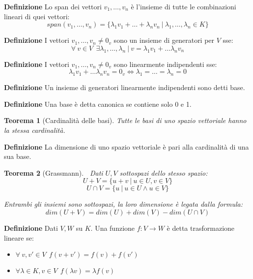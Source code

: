 \documentclass{article}
\newtheorem{theorem}{Teorema}
\begin{document}
\noindent\textbf{Definizione} Lo span dei vettori $v_1,\ldots,v_n$ è l'insieme di tutte le combinazioni lineari di quei vettori:
$$span(v_1,\ldots,v_n)=\{\lambda_1 v_1+\ldots+\lambda_n v_n\ |\ \lambda_1,\ldots,\lambda_n\in K\}$$\newline

\noindent\textbf{Definizione} I vettori $v_1,\ldots,v_n\neq 0_v$ sono un insieme di generatori per $V$ sse:
$$\forall\ v\in V\ \ \exists\lambda_1,\ldots,\lambda_n\ |\ v=\lambda_1v_1+\ldots
\lambda_nv_n$$\newline

\noindent\textbf{Definizione} I vettori $v_1,\ldots,v_n\neq 0_v$ sono linearmente indipendenti sse:
$$\lambda_1v_1+\ldots
\lambda_nv_n=0_v\iff \lambda_1=\ldots=\lambda_n=0$$\newline

\noindent\textbf{Definizione} Un insieme di generatori linearmente indipendenti sono detti base.\newline

\noindent\textbf{Definizione} Una base è detta canonica se contiene solo 0 e 1.\newline

\begin{theorem}[Cardinalità delle basi]
    Tutte le basi di uno spazio vettoriale hanno la stessa cardinalità.\newline
\end{theorem}

\noindent\textbf{Definizione} La dimensione di uno spazio vettoriale è pari alla cardinalità di una sua base.\newline

\begin{theorem}[Grassmann]$\ $\newline
    Dati $U,V$ sottospazi dello stesso spazio:
    $$U+V=\{u+v\ |\ u\in U,v\in V\}$$
    $$U\cap V=\{u\ |\ u\in U\wedge u\in V\}$$

    \noindent Entrambi gli insiemi sono sottospazi, la loro dimensione è legata dalla formula:
    $$dim(U+V)=dim(U)+dim(V)-dim(U\cap V)$$\newline
\end{theorem}

\noindent\textbf{Definizione} Dati $V,W$ su $K$. Una funzione $f:V\rightarrow W$ è detta trasformazione lineare se:
\begin{itemize}
    \item $\forall\ v,v'\in V\ \ f(v+v')=f(v)+f(v')$
    \item $\forall\lambda\in K,v\in V\ \ f(\lambda v)=\lambda f(v)$\newline
\end{itemize}
\end{document}
